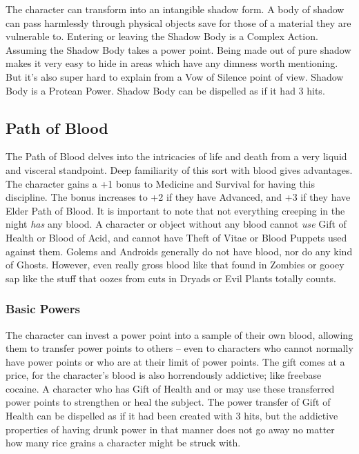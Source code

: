  The character can transform into an intangible shadow form. A body of shadow can pass harmlessly through physical objects save for those of a material they are vulnerable to. Entering or leaving the Shadow Body is a Complex Action. Assuming the Shadow Body takes a power point. Being made out of pure shadow makes it very easy to hide in areas which have any dimness worth mentioning. But it's also super hard to explain from a Vow of Silence point of view. Shadow Body is a Protean Power. Shadow Body can be dispelled as if it had 3 hits.


\subsection{Path of Blood}

The Path of Blood delves into the intricacies of life and death from a very liquid and visceral standpoint. Deep familiarity of this sort with blood gives advantages. The character gains a +1 bonus to Medicine and Survival for having this discipline. The bonus increases to +2 if they have Advanced, and +3 if they have Elder Path of Blood. It is important to note that not everything creeping in the night \textit{has} any blood. A character or object without any blood cannot \textit{use} Gift of Health or Blood of Acid, and cannot have Theft of Vitae or Blood Puppets used against them. Golems and Androids generally do not have blood, nor do any kind of Ghosts. However, even really gross blood like that found in Zombies or gooey sap like the stuff that oozes from cuts in Dryads or Evil Plants totally counts.

\subsubsection{Basic Powers}

 The character can invest a power point into a sample of their own blood, allowing them to transfer power points to others -- even to characters who cannot normally have power points or who are at their limit of power points. The gift comes at a price, for the character's blood is also horrendously addictive; like freebase cocaine. A character who has Gift of Health and  or  may use these transferred power points to strengthen or heal the subject. The power transfer of Gift of Health can be dispelled as if it had been created with 3 hits, but the addictive properties of having drunk power in that manner does not go away no matter how many rice grains a character might be struck with.

